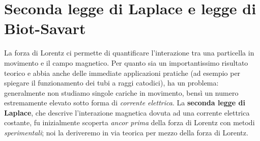 \section{Seconda legge di Laplace e legge di Biot-Savart} %
La forza di Lorentz ci permette di quantificare l'interazione tra una particella in movimento e il campo magnetico. Per quanto sia un importantissimo risultato teorico e abbia anche delle immediate applicazioni pratiche (ad esempio per spiegare il funzionamento dei tubi a raggi catodici), ha un problema: generalmente non studiamo singole cariche in movimento, bensì un numero estremamente elevato sotto forma di \textit{corrente elettrica}. La \textbf{seconda legge di Laplace}, che descrive l'interazione magnetica dovuta ad una corrente elettrica costante, fu inizialmente scoperta \textit{ancor prima} della forza di Lorentz con metodi \textit{sperimentali}; noi la deriveremo in via teorica per mezzo della forza di Lorentz.

